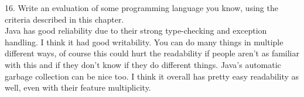 \documentclass{article}
\begin{document}
16. Write an evaluation of some programming language you know, using the
criteria described in this chapter.\\
Java has good reliability due to their strong type-checking and exception handling. I think it had good writability. You can do many things in multiple different ways, of course this could hurt the readability if people aren't as familiar with this and if they don't know if they do different things. Java's automatic garbage collection can be nice too. I think it overall has pretty easy readability as well, even with their feature multiplicity.
\end{document}
